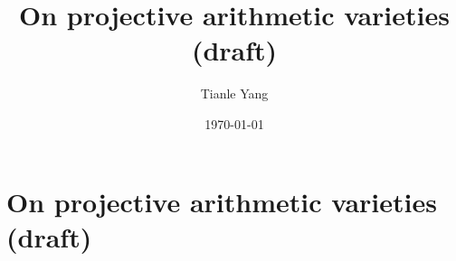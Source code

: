\documentclass{noteformyself}
\title{On projective arithmetic varieties (draft)}
\author{Tianle Yang}
\date{\today}
\begin{document}
    \maketitle

    \section{On projective arithmetic varieties (draft)}



\end{document}
